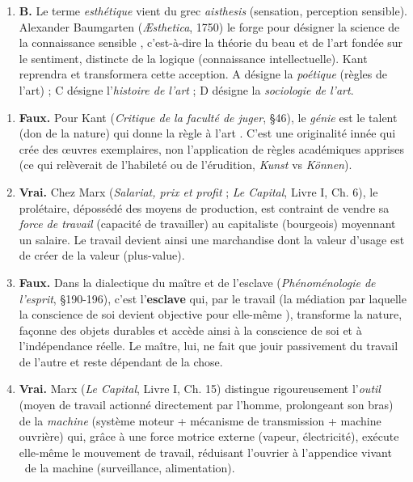 \documentclass[11pt]{article}
\begin{document}
\begin{corrige}
\begin{enumerate}
\item \textbf{B.} Le terme \emph{esthétique} vient du grec \emph{aisthesis} (sensation, perception sensible). Alexander Baumgarten (\emph{Æsthetica}, 1750) le forge pour désigner la \guillemotleft science de la connaissance sensible \guillemotright, c'est-à-dire la théorie du beau et de l'art fondée sur le sentiment, distincte de la logique (connaissance intellectuelle). Kant reprendra et transformera cette acception. A désigne la \emph{poétique} (règles de l'art) ; C désigne l'\emph{histoire de l'art} ; D désigne la \emph{sociologie de l'art}.
\end{enumerate}
\end{corrige}

\begin{corrige}
\begin{enumerate}
\item \textbf{Faux.} Pour Kant (\emph{Critique de la faculté de juger}, §46), le \emph{génie} est \guillemotleft le talent (don de la nature) qui donne la règle à l'art \guillemotright. C'est une originalité innée qui crée des œuvres exemplaires, non l'application de règles académiques apprises (ce qui relèverait de l'habileté ou de l'érudition, \emph{Kunst} vs \emph{Können}).
\item \textbf{Vrai.} Chez Marx (\emph{Salariat, prix et profit} ; \emph{Le Capital}, Livre I, Ch. 6), le prolétaire, dépossédé des moyens de production, est contraint de vendre sa \emph{force de travail} (capacité de travailler) au capitaliste (bourgeois) moyennant un salaire. Le travail devient ainsi une marchandise dont la valeur d'usage est de créer de la valeur (plus-value).
\item \textbf{Faux.} Dans la dialectique du maître et de l'esclave (\emph{Phénoménologie de l'esprit}, §190-196), c'est l'\textbf{esclave} qui, par le travail (\guillemotleft la médiation par laquelle la conscience de soi devient objective pour elle-même \guillemotright), transforme la nature, façonne des objets durables et accède ainsi à la conscience de soi et à l'indépendance réelle. Le maître, lui, ne fait que jouir passivement du travail de l'autre et reste dépendant de la chose.
\item \textbf{Vrai.} Marx (\emph{Le Capital}, Livre I, Ch. 15) distingue rigoureusement l'\emph{outil} (moyen de travail actionné directement par l'homme, prolongeant son bras) de la \emph{machine} (système moteur + mécanisme de transmission + machine ouvrière) qui, grâce à une force motrice externe (vapeur, électricité), exécute elle-même le mouvement de travail, réduisant l'ouvrier à \guillemotleft l'appendice vivant \guillemotright\ de la machine (surveillance, alimentation).

\end{enumerate}
\end{corrige}
\end{document}
